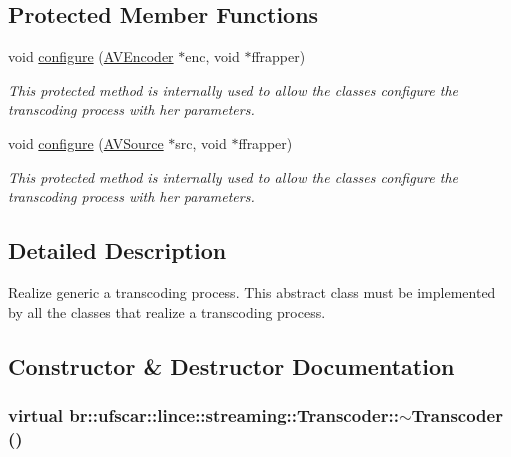 \subsection*{Protected Member Functions}
\begin{DoxyCompactItemize}
\item 
void \hyperlink{classbr_1_1ufscar_1_1lince_1_1streaming_1_1Transcoder_ac4c410516ff38a4b2a978077aea67064}{configure} (\hyperlink{classbr_1_1ufscar_1_1lince_1_1streaming_1_1AVEncoder}{AVEncoder} $\ast$enc, void $\ast$ffrapper)
\begin{DoxyCompactList}\small\item\em This protected method is internally used to allow the classes configure the transcoding process with her parameters. \item\end{DoxyCompactList}\item 
void \hyperlink{classbr_1_1ufscar_1_1lince_1_1streaming_1_1Transcoder_a04f5ea04a3111f055853b0975c6744ae}{configure} (\hyperlink{classbr_1_1ufscar_1_1lince_1_1streaming_1_1AVSource}{AVSource} $\ast$src, void $\ast$ffrapper)
\begin{DoxyCompactList}\small\item\em This protected method is internally used to allow the classes configure the transcoding process with her parameters. \item\end{DoxyCompactList}\end{DoxyCompactItemize}


\subsection{Detailed Description}
Realize generic a transcoding process. This abstract class must be implemented by all the classes that realize a transcoding process. 

\subsection{Constructor \& Destructor Documentation}
\hypertarget{classbr_1_1ufscar_1_1lince_1_1streaming_1_1Transcoder_a4139c5f7d098ae0a2b9e2e4d314ab991}{
\subsubsection[{$\sim$Transcoder}]{\setlength{\rightskip}{0pt plus 5cm}virtual br::ufscar::lince::streaming::Transcoder::$\sim$Transcoder ()}}
\label{classbr_1_1ufscar_1_1lince_1_1streaming_1_1Transcoder_a4139c5f7d098ae0a2b9e2e4d314ab991}


